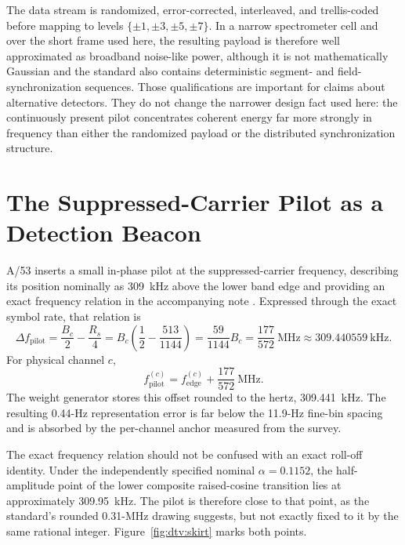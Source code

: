The data stream is randomized, error-corrected, interleaved, and trellis-coded
before mapping to levels $\{\pm1,\pm3,\pm5,\pm7\}$.  In a narrow spectrometer
cell and over the short frame used here, the resulting payload is therefore
well approximated as broadband noise-like power, although it is not
mathematically Gaussian and the standard also contains deterministic segment-
and field-synchronization sequences.  Those qualifications are important for
claims about alternative detectors.  They do not change the narrower design
fact used here: the continuously present pilot concentrates coherent energy far
more strongly in frequency than either the randomized payload or the distributed
synchronization structure.

\section{The Suppressed-Carrier Pilot as a Detection Beacon}
\label{sec:dtv:pilot}

A/53 inserts a small in-phase pilot at the suppressed-carrier frequency,
describing its position nominally as 309~kHz above the lower band edge and
providing an exact frequency relation in the accompanying note
\cite{atsc-a53,atsc-a53-part2}.  Expressed through the exact symbol rate, that relation is
\begin{equation}
\label{eq:pilotoffset}
\Delta f_{\mathrm{pilot}}
 = \frac{B_c}{2}-\frac{R_s}{4}
 = B_c\left(\frac{1}{2}-\frac{513}{1144}\right)
 = \frac{59}{1144}B_c
 = \frac{177}{572}~\mathrm{MHz}
 \approx 309.440559~\mathrm{kHz}.
\end{equation}
For physical channel $c$,
\begin{equation}
\label{eq:pilotfreq}
f_{\mathrm{pilot}}^{(c)}
 = f_{\mathrm{edge}}^{(c)}+\frac{177}{572}~\mathrm{MHz}.
\end{equation}
The weight generator stores this offset rounded to the hertz,
309.441~kHz.  The resulting 0.44-Hz representation error is far below the
11.9-Hz fine-bin spacing and is absorbed by the per-channel anchor measured from
the survey.

The exact frequency relation should not be confused with an exact roll-off
identity.  Under the independently specified nominal $\alpha=0.1152$, the
half-amplitude point of the lower composite raised-cosine transition lies at
approximately 309.95~kHz.  The pilot is therefore close to that point, as the
standard's rounded 0.31-MHz drawing suggests, but not exactly fixed to it by the
same rational integer.  Figure~\ref{fig:dtv:skirt} marks both points.

